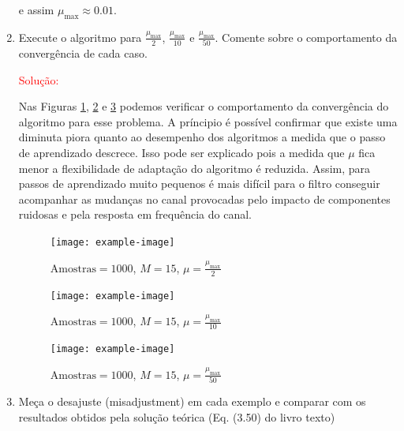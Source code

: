 \begin{enumerate}
        e assim $\mu_{\text{max}} \approx 0.01$.

    \item Execute o algoritmo para $\frac{\mu_{\text{max}}}{2}$, $\frac{\mu_{\text{max}}}{10}$ e $\frac{\mu_{\text{max}}}{50}$. Comente sobre o comportamento da convergência de cada caso.

        \textcolor{red}{Solução:}


        Nas Figuras \ref{fig:mu_2}, \ref{fig:mu_10} e \ref{fig:mu_50} podemos verificar o comportamento da convergência do algoritmo para esse problema. A príncipio é possível 
        confirmar que existe uma diminuta piora quanto ao desempenho dos algoritmos a medida que o passo de aprendizado descrece. Isso pode ser explicado pois a medida que 
        $\mu$ fica menor a flexibilidade de adaptação do algoritmo é reduzida. Assim, para passos de aprendizado muito pequenos é mais difícil para o filtro conseguir acompanhar
        as mudanças no canal provocadas pelo impacto de componentes ruidosas e pela resposta em frequência do canal. 

        \begin{figure}[!htp]
            \centering
            \texttt{[image: example-image]}
            \caption{$\text{Amostras} = 1000$, $M = 15$, $\mu = \frac{\mu_{\text{max}}}{2}$}
            \label{fig:mu_2}
        \end{figure}
    
        \begin{figure}[!htp]
            \centering
            \texttt{[image: example-image]}
            \caption{$\text{Amostras} = 1000$, $M = 15$, $\mu = \frac{\mu_{\text{max}}}{10}$}
            \label{fig:mu_10}
        \end{figure}
    
        \begin{figure}[!htp]
            \centering
            \texttt{[image: example-image]}
            \caption{$\text{Amostras} = 1000$, $M = 15$, $\mu = \frac{\mu_{\text{max}}}{50}$}
            \label{fig:mu_50}
        \end{figure}
        
        \clearpage


        \item Meça o desajuste (misadjustment) em cada exemplo e comparar com os resultados obtidos pela solução teórica (Eq. (3.50) do livro texto)					


\end{enumerate}
